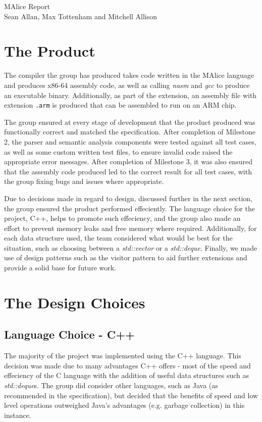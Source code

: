 \documentclass[a4wide, 11pt]{article}
\begin{document}
\begin{center}
{\huge MAlice Report} \\ [0.4cm]
{\large Sean Allan, Max Tottenham and Mitchell Allison} \\ [0.2cm]
\vspace{1cm}
\end{center}

\section{The Product}

The compiler the group has produced takes code written in the MAlice language
and produces x86-64 assembly code, as well as calling \emph{nasm} and \emph{gcc}
to produce an executable binary. Additionally, as part of the extension, an
assembly file with extension \texttt{.arm} is produced that can be assembled
to run on an ARM chip.

The group ensured at every stage of development that the product produced
was functionally correct and matched the specification. After completion of
Milestone 2, the parser and semantic analysis components were tested against
all test cases, as well as some custom written test files, to ensure invalid
code raised the appropriate error messages. After completion of Milestone 3, it
was also ensured that the assembly code produced led to the correct result 
for all test cases, with the group fixing bugs and issues where appropriate.

Due to decisions made in regard to design, discussed further in the next
section, the group ensured the product performed effeciently. The language
choice for the project, C++, helps to promote such effeciency, and the group
also made an effort to prevent memory leaks and free memory where required. 
Additionally, for each data structure used, the team considered what would be
best for the situation, such as choosing between a \emph{std::vector} or a
\emph{std::deque}. Finally, we made use of design patterns such as the visitor
pattern to aid further extensions and provide a solid base for future work.

\section{The Design Choices}

\subsection{Language Choice - C++}
The majority of the project was implemented using the C++ language. This
decision was made due to many advantages C++ offers - most of the speed and
effeciency of the C language with the addition of useful data structures such
as \emph{std::deque}s. The group did consider other languages, such as Java (as
recommended in the specification), but decided that the benefits of speed and
low level operations outweighed Java's advantages (e.g. garbage collection) in
this instance.
\end{document}
